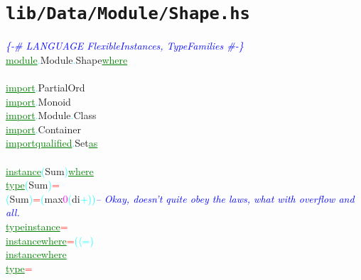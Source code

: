 \section{\texttt{lib/Data/Module/Shape.hs}}
\label{mod:Data.Module.Shape}
\textcolor{blue}{{\it{}\{-\# LANGUAGE FlexibleInstances, TypeFamilies \#-\}}}\\\textcolor{green}{\underline{module}}\textcolor{cyan}{.}{\rm{}Module}\textcolor{cyan}{.}{\rm{}Shape}\hsspace \textcolor{green}{\underline{where}}\\\\\textcolor{green}{\underline{import}}\textcolor{cyan}{.}{\rm{}PartialOrd}\\\textcolor{green}{\underline{import}}\textcolor{cyan}{.}{\rm{}Monoid}\\\textcolor{green}{\underline{import}}\textcolor{cyan}{.}{\rm{}Module}\textcolor{cyan}{.}{\rm{}Class}\\\textcolor{green}{\underline{import}}\textcolor{cyan}{.}{\rm{}Container}\\\textcolor{green}{\underline{import}}\hsspace \textcolor{green}{\underline{qualified}}\textcolor{cyan}{.}{\rm{}Set}\hsspace \textcolor{green}{\underline{as}}\\\\\textcolor{green}{\underline{instance}}\hsspace \textcolor{cyan}{(}{\rm{}Sum}\textcolor{cyan}{)}\hsspace \textcolor{green}{\underline{where}}\\\hstab \textcolor{green}{\underline{type}}\hsspace \textcolor{cyan}{(}{\rm{}Sum}\textcolor{cyan}{)}\hsspace \textcolor{red}{=}\\\hsspace \textcolor{cyan}{(}{\rm{}Sum}\textcolor{cyan}{)}\hsspace \textcolor{red}{=}\hsspace \textcolor{cyan}{(}{\rm{}max}\hsspace \textcolor{magenta}{0}\hsspace \textcolor{cyan}{(}{\rm{}di}\hsspace \textcolor{cyan}{+}\textcolor{cyan}{)}\textcolor{cyan}{)}\hsspace \textcolor{blue}{{\it{}-- Okay, doesn't quite obey the laws, what with overflow and all.}}\\\textcolor{green}{\underline{type}}\hsspace \textcolor{green}{\underline{instance}}\hsspace \textcolor{red}{=}\\\textcolor{green}{\underline{instance}}\hsspace \textcolor{green}{\underline{where}}\hsspace \textcolor{red}{=}\hsspace \textcolor{cyan}{(}\textcolor{cyan}{\ensuremath{\langle}=}\textcolor{cyan}{)}\\\textcolor{green}{\underline{instance}}\hsspace \textcolor{green}{\underline{where}}\\\hstab \textcolor{green}{\underline{type}}\hsspace \textcolor{red}{=}\\\hsspace 